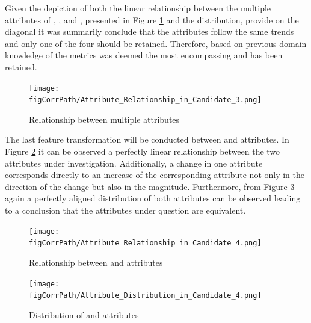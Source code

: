 \begin{enumerate}
Given the depiction of both the linear relationship between the multiple  attributes of \overallCoverage{}, \overallLineCoverage{},\coverage{} and \lineCoverage{}, presented in Figure \ref{fig:candidate3-pairplot} and the distribution, provide on the diagonal it was summarily conclude that the attributes follow the same trends and only one of the four should be retained. Therefore, based on previous domain knowledge of the metrics \overallCoverage{} was deemed the most encompassing and has been retained.
\begin{figure}[h!]
    \centering
    \texttt{[image: \\figCorrPath/Attribute\_Relationship\_in\_Candidate\_3.png]}
    \caption{Relationship between multiple attributes}
    \label{fig:candidate3-pairplot}
\end{figure}

\FloatBarrier

The last feature transformation will be conducted between \overallUncoveredConditions{} and \uncoveredConditions{} attributes. In Figure \ref{fig:candidate4-scatterplot} it can be observed a perfectly linear relationship between the two attributes under investigation. Additionally, a change in one attribute corresponds directly to an increase of the corresponding attribute not only in the direction of the change but also in the magnitude. Furthermore, from Figure \ref{fig:candidate4-distribution} again a perfectly aligned distribution of both attributes can be observed leading to a conclusion that the attributes under question are equivalent.

\begin{figure}[h!]
    \centering
    \texttt{[image: \\figCorrPath/Attribute\_Relationship\_in\_Candidate\_4.png]}
    \caption{Relationship between \overallUncoveredConditions{} and \uncoveredConditions{} attributes}
    \label{fig:candidate4-scatterplot}
\end{figure}

\begin{figure}[h!]
    \centering
    \texttt{[image: \\figCorrPath/Attribute\_Distribution\_in\_Candidate\_4.png]}
    \caption{Distribution of \overallUncoveredConditions{} and \uncoveredConditions{} attributes}
    \label{fig:candidate4-distribution}
\end{figure}


\end{enumerate}
